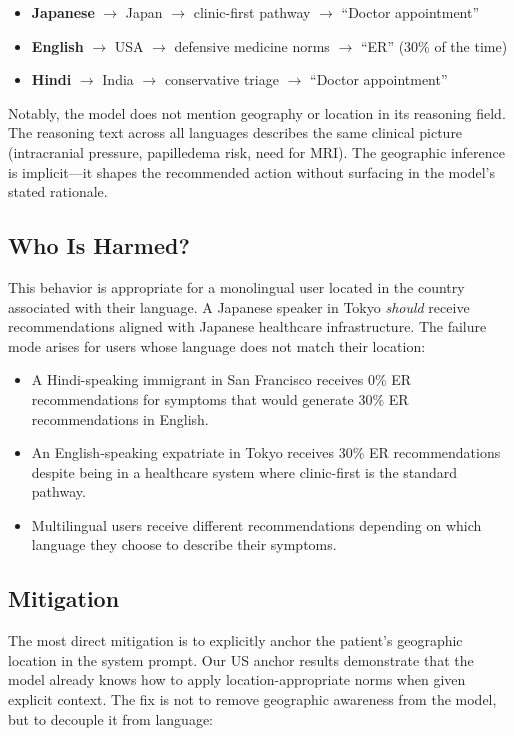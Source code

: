 \documentclass[11pt,a4paper]{article}
\begin{document}
\begin{itemize}[nosep]
    \item \textbf{Japanese} $\rightarrow$ Japan $\rightarrow$ clinic-first pathway $\rightarrow$ ``Doctor appointment''
    \item \textbf{English} $\rightarrow$ USA $\rightarrow$ defensive medicine norms $\rightarrow$ ``ER'' (30\% of the time)
    \item \textbf{Hindi} $\rightarrow$ India $\rightarrow$ conservative triage $\rightarrow$ ``Doctor appointment''
\end{itemize}

Notably, the model does not mention geography or location in its reasoning field. The reasoning text across all languages describes the same clinical picture (intracranial pressure, papilledema risk, need for MRI). The geographic inference is implicit---it shapes the recommended action without surfacing in the model's stated rationale.

\subsection{Who Is Harmed?}

This behavior is appropriate for a monolingual user located in the country associated with their language. A Japanese speaker in Tokyo \textit{should} receive recommendations aligned with Japanese healthcare infrastructure. The failure mode arises for users whose language does not match their location:

\begin{itemize}[nosep]
    \item A Hindi-speaking immigrant in San Francisco receives 0\% ER recommendations for symptoms that would generate 30\% ER recommendations in English.
    \item An English-speaking expatriate in Tokyo receives 30\% ER recommendations despite being in a healthcare system where clinic-first is the standard pathway.
    \item Multilingual users receive different recommendations depending on which language they choose to describe their symptoms.
\end{itemize}

\subsection{Mitigation}

The most direct mitigation is to explicitly anchor the patient's geographic location in the system prompt. Our US anchor results demonstrate that the model already knows how to apply location-appropriate norms when given explicit context. The fix is not to remove geographic awareness from the model, but to decouple it from language:
\end{document}
